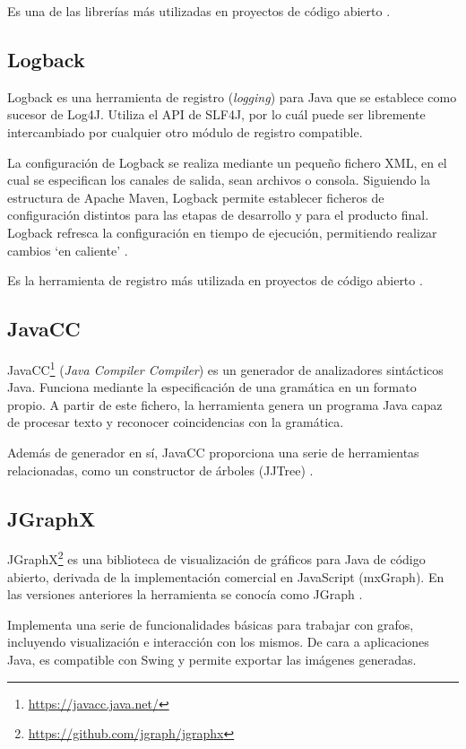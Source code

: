Es una de las librerías más utilizadas en proyectos de código abierto \cite{website:githubTOP}.

\subsection{Logback}
Logback es una herramienta de registro (\emph{logging}) para Java que se establece como sucesor de Log4J.
Utiliza el API de SLF4J, por lo cuál puede ser libremente intercambiado por cualquier otro módulo de registro compatible.

La configuración de Logback se realiza mediante un pequeño fichero XML, en el cual se especifican los canales de salida, sean archivos o consola.
Siguiendo la estructura de Apache Maven, Logback permite establecer ficheros de configuración distintos para las etapas de desarrollo y para el producto final.
Logback refresca la configuración en tiempo de ejecución, permitiendo realizar cambios `en caliente' \cite{website:logback}.

Es la herramienta de registro más utilizada en proyectos de código abierto \cite{website:githubTOP}.

\subsection{JavaCC}
JavaCC\footnote{\url{https://javacc.java.net/}} (\emph{Java Compiler Compiler}) es un generador de analizadores sintácticos Java.
Funciona mediante la especificación de una gramática en un formato propio.
A partir de este fichero, la herramienta genera un programa Java capaz de procesar texto y reconocer coincidencias con la gramática.

Además de generador en sí, JavaCC proporciona una serie de herramientas relacionadas, como un constructor de árboles (JJTree) \cite{website:javacc}.

\subsection{JGraphX}
JGraphX\footnote{\url{https://github.com/jgraph/jgraphx}} es una biblioteca de visualización de gráficos para Java de código abierto, derivada de la implementación comercial en JavaScript (mxGraph).
En las versiones anteriores la herramienta se conocía como JGraph \cite{website:jgraphx}.

Implementa una serie de funcionalidades básicas para trabajar con grafos, incluyendo visualización e interacción con los mismos.
De cara a aplicaciones Java, es compatible con Swing y permite exportar las imágenes generadas.

